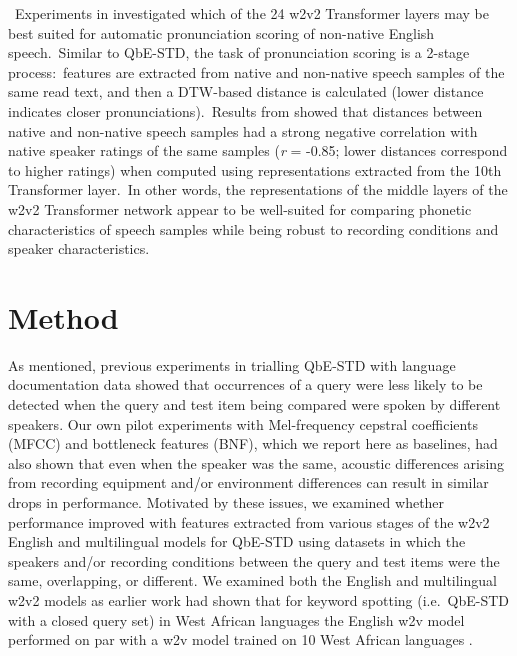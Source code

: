 \documentclass[main.tex]{subfiles}
\begin{document}
~Experiments in \textcite{bartelds2022neural} investigated which of the 24 w2v2 Transformer layers may be best suited for automatic pronunciation scoring of non-native English speech.~Similar to QbE-STD, the task of pronunciation scoring is a 2-stage process:~features are extracted from native and non-native speech samples of the same read text, and then a DTW-based distance is calculated (lower distance indicates closer pronunciations).~Results from \textcite{bartelds2022neural} showed that distances between native and non-native speech samples had a strong negative correlation with native speaker ratings of the same samples (\emph{r} = \mbox{-0.85}; lower distances correspond to higher ratings) when computed using representations extracted from the 10th Transformer layer.~In other words, the representations of the middle layers of the w2v2 Transformer network appear to be well-suited for comparing phonetic characteristics of speech samples while being robust to recording conditions and speaker characteristics.

\section{Method}

As mentioned, previous experiments in \textcite{le-ferrand-etal-2020-enabling} trialling QbE-STD with language documentation data showed that occurrences of a query were less likely to be detected when the query and test item being compared were spoken by different speakers.
Our own pilot experiments with Mel-frequency cepstral coefficients (MFCC) and bottleneck features (BNF), which we report here as baselines, had also shown that even when the speaker was the same, acoustic differences arising from recording equipment and/or environment differences can result in similar drops in performance.
Motivated by these issues, we examined whether performance improved with features extracted from various stages of the w2v2 English and multilingual models for QbE-STD using datasets in which the speakers and/or recording conditions between the query and test items were the same, overlapping, or different.
We examined both the English and multilingual w2v2 models as earlier work had shown that for keyword spotting (i.e.~QbE-STD with a closed query set) in West African languages the English w2v model performed on par with a w2v model trained on 10 West African languages \parencite{doumbouya2021usingradio}.
\end{document}
